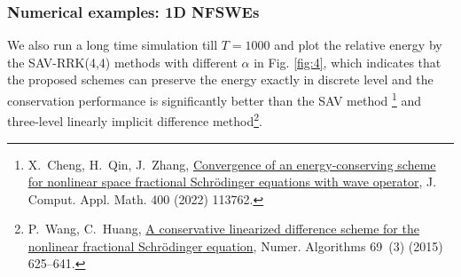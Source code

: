 \documentclass[aspectratio=169]{beamer}
\begin{document}
	\begin{frame}\frametitle{Numerical examples: 1D NFSWEs}
	We also run a long time simulation till $T=1000$ and plot the relative energy by the SAV-RRK(4,4) methods with different $\alpha$ in Fig. \ref{fig:4},
	which indicates that the proposed schemes can preserve the energy exactly in discrete level and the conservation performance is significantly better
	than the SAV method \footnote{\tiny X.~Cheng, H.~Qin, J.~Zhang,
	\href{https://linkinghub.elsevier.com/retrieve/pii/S0377042721003848}{Convergence
	of an energy-conserving scheme for nonlinear space fractional
	{{Schr\"odinger}} equations with wave operator}, J. Comput. Appl. Math. 400
	(2022) 113762.
	} and three-level linearly implicit difference method\footnote{\tiny 	P.~Wang, C.~Huang, \href{https://doi.org/10.1007/s11075-014-9917-x}{A
	conservative linearized difference scheme for the nonlinear fractional
	{{Schr\"odinger}} equation}, Numer. Algorithms 69~(3) (2015) 625--641.}.
	\end{frame}
	
\end{document}
